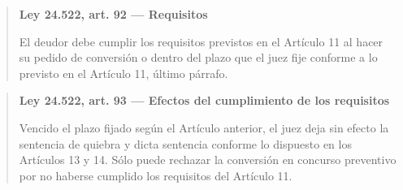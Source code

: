 \documentclass[12pt,oneside]{book}
\newenvironment{articulo}[1]
  {\begin{quote}\small\textbf{#1}\par\smallskip}
  {\end{quote}}
\begin{document}
\begin{articulo}{Ley 24.522, art. 92 --- Requisitos}
El deudor debe cumplir los requisitos previstos en el Artículo 11 al hacer su pedido de conversión o dentro del plazo que el juez fije conforme a lo previsto en el Artículo 11, último párrafo.
\end{articulo}

\begin{articulo}{Ley 24.522, art. 93 --- Efectos del cumplimiento de los requisitos}
Vencido el plazo fijado según el Artículo anterior, el juez deja sin efecto la sentencia de quiebra y dicta sentencia conforme lo dispuesto en los Artículos 13 y 14. Sólo puede rechazar la conversión en concurso preventivo por no haberse cumplido los requisitos del Artículo 11.
\end{articulo}
\end{document}
